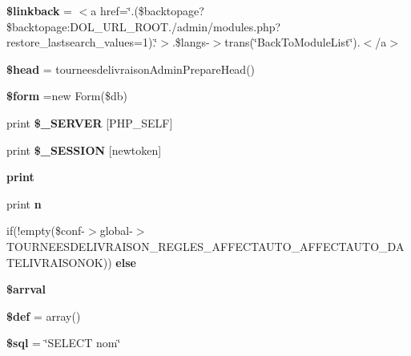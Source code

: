 \begin{DoxyCompactItemize}
{\bfseries \$linkback} = \textquotesingle{}$<$a href=\char`\"{}\textquotesingle{}.(\$backtopage?\$backtopage\+:\+D\+O\+L\+\_\+\+U\+R\+L\+\_\+\+R\+O\+O\+T.\textquotesingle{}/admin/modules.\+php?restore\+\_\+lastsearch\+\_\+values=1\textquotesingle{}).\textquotesingle{}\char`\"{}$>$\textquotesingle{}.\$langs-\/$>$trans(\char`\"{}Back\+To\+Module\+List\char`\"{}).\textquotesingle{}$<$/a$>$\textquotesingle{}
\item 
\mbox{\label{setup_8php_a687ea7fcd78263867b5bd34ed56b6379}} 
{\bfseries \$head} = tourneesdelivraison\+Admin\+Prepare\+Head()
\item 
\mbox{\label{setup_8php_a1a4fda4c28a9ee5f91102c023b9501f4}} 
{\bfseries \$form} =new Form(\$db)
\item 
\mbox{\label{setup_8php_a2b596c6f93d14726cedde094189e00c4}} 
print {\bfseries \$\+\_\+\+S\+E\+R\+V\+ER} \mbox{[}\textquotesingle{}P\+H\+P\+\_\+\+S\+E\+LF\textquotesingle{}\mbox{]}
\item 
\mbox{\label{setup_8php_aaaa3bcf5b2223199f799002520f91bd7}} 
print {\bfseries \$\+\_\+\+S\+E\+S\+S\+I\+ON} \mbox{[}\textquotesingle{}newtoken\textquotesingle{}\mbox{]}
\item 
\mbox{\label{setup_8php_a8ad7c5b8e0149bfaf0d2a34149e2edf8}} 
{\bfseries print}
\item 
\mbox{\label{setup_8php_aa1514cd512d27b0f6cd83ce89d2f3475}} 
print {\bfseries n}
\item 
if(!empty(\$conf-\/$>$global-\/$>$T\+O\+U\+R\+N\+E\+E\+S\+D\+E\+L\+I\+V\+R\+A\+I\+S\+O\+N\+\_\+\+R\+E\+G\+L\+E\+S\+\_\+\+A\+F\+F\+E\+C\+T\+A\+U\+T\+O\+\_\+\+A\+F\+F\+E\+C\+T\+A\+U\+T\+O\+\_\+\+D\+A\+T\+E\+L\+I\+V\+R\+A\+I\+S\+O\+N\+OK)) {\bfseries else}
\item 
{\bfseries \$arrval}
\item 
\mbox{\label{setup_8php_a9f8f890e2d5fb4b002a11db42621b997}} 
{\bfseries \$def} = array()
\item 
\mbox{\label{setup_8php_a7f00382b9231fafd3ad71e9dc1135c0d}} 
{\bfseries \$sql} = \char`\"{}S\+E\+L\+E\+CT nom\char`\"{}
\item 

\end{DoxyCompactItemize}
